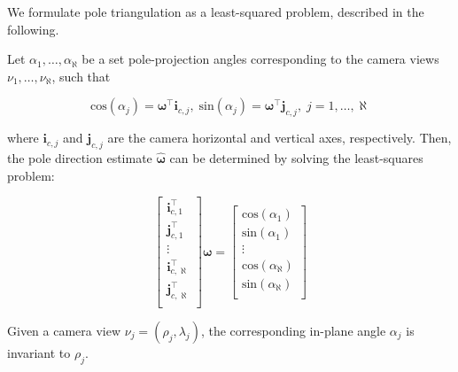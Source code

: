 We formulate pole triangulation as a least-squared problem, described in the following.

\begin{theorem}
    \label{th:pole_triang}
    Let $\alpha_1, \dots, \alpha_\aleph$ be a set pole-projection angles corresponding to the camera views $\nu_1, \dots, \nu_\aleph$, such that

    \begin{equation}
    \label{eq:cos_alpha}
        \mathrm{cos}(\alpha_j) = \boldsymbol{\omega}^\top \mathbf{i}_{c,j}, \; \mathrm{sin}(\alpha_j) = \boldsymbol{\omega}^\top \mathbf{j}_{c,j}, \; j = 1,\dots,\aleph
    \end{equation}

where $\mathbf{i}_{c,j}$ and $\mathbf{j}_{c,j}$ are the camera horizontal and vertical axes, respectively. Then, the pole direction estimate $\hat{\boldsymbol{\omega}}$ can be determined by solving the least-squares problem:

    \begin{equation}
    \label{eq:pole_triang}
        \begin{bmatrix}
            \mathbf{i}_{c,1}^\top \\
            \mathbf{j}_{c,1}^\top \\
            \vdots \\
            \mathbf{i}_{c,\aleph}^\top\\
            \mathbf{j}_{c,\aleph}^\top \\
        \end{bmatrix} \boldsymbol{\omega} = 
        \begin{bmatrix}
            \mathrm{cos}(\alpha_1) \\
            \mathrm{sin}(\alpha_1)\\
            \vdots \\
            \mathrm{cos}(\alpha_\aleph) \\
            \mathrm{sin}(\alpha_\aleph)\\
        \end{bmatrix}
    \end{equation}
    
\end{theorem}

\begin{corollary}
    Given a camera view $\nu_j=(\rho_j,\lambda_j)$, the corresponding in-plane angle $\alpha_j$ is invariant to $\rho_j$.
\end{corollary}

